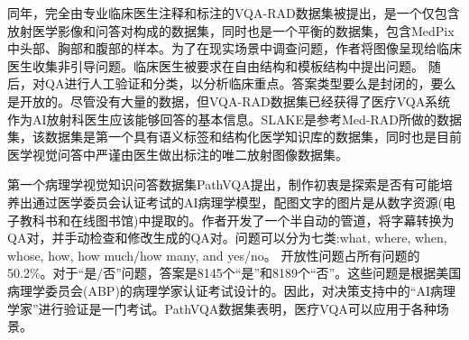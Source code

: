 同年，完全由专业临床医生注释和标注的VQA-RAD\cite{lau2018dataset}数据集被提出，是一个仅包含放射医学影像和问答对构成的数据集，同时也是一个平衡的数据集，包含MedPix中头部、胸部和腹部的样本。为了在现实场景中调查问题，作者将图像呈现给临床医生收集非引导问题。临床医生被要求在自由结构和模板结构中提出问题。
随后，对QA进行人工验证和分类，以分析临床重点。答案类型要么是封闭的，要么是开放的。尽管没有大量的数据，但VQA-RAD数据集已经获得了医疗VQA系统作为AI放射科医生应该能够回答的基本信息。SLAKE\cite{liu2021slake}是参考Med-RAD所做的数据集，该数据集是第一个具有语义标签和结构化医学知识库的数据集，同时也是目前医学视觉问答中严谨由医生做出标注的唯二放射图像数据集。

第一个病理学视觉知识问答数据集PathVQA\cite{he2020pathvqa}提出，制作初衷是探索是否有可能培养出通过医学委员会认证考试的AI病理学模型，配图文字的图片是从数字资源(电子教科书和在线图书馆)中提取的。作者开发了一个半自动的管道，将字幕转换为QA对，并手动检查和修改生成的QA对。问题可以分为七类:what, where, when, whose, how, how much/how many, and yes/no。
开放性问题占所有问题的50.2\%。对于“是/否”问题，答案是8145个“是”和8189个“否”。这些问题是根据美国病理学委员会(ABP)的病理学家认证考试设计的。因此，对决策支持中的“AI病理学家”进行验证是一门考试。PathVQA数据集表明，医疗VQA可以应用于各种场景。

